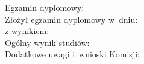 \newpage
	\thispagestyle{empty}
\begin{flushleft}
    	\begin{minipage}{11cm}
		Egzamin dyplomowy: \\
		Złożył egzamin dyplomowy w~dniu: \dotfill \\
		z wynikiem: \dotfill \\
		Ogólny wynik studiów: \dotfill \\
		Dodatkowe uwagi i~wnioski Komisji: \dotfill \\
		\dotfill
	\end{minipage}
\end{flushleft}
\cleardoublepage
